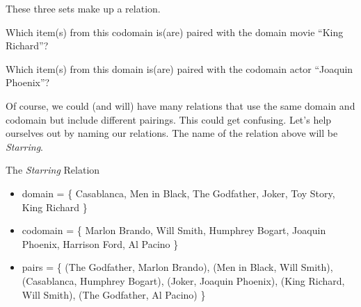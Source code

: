 \documentclass{ximera}
\begin{document}
These three sets make up a relation. 



\begin{question}

Which item(s) from this codomain is(are) paired with the domain movie ``King Richard''?
\begin{selectAll}
\end{selectAll}

\end{question}








\newpage

\begin{question}

Which item(s) from this domain is(are) paired with the codomain actor ``Joaquin Phoenix''?
\begin{selectAll}
\end{selectAll}

\end{question}






Of course, we could (and will) have many relations that use the same domain and codomain but include different pairings. This could get confusing.  Let's help ourselves out by naming our relations.  The name of the relation above will be \textit{Starring}.


\begin{example} The \textit{Starring} Relation

\begin{itemize}
\item domain = \{ Casablanca, Men in Black,  The Godfather, Joker, Toy Story, King Richard \}  
\item codomain = \{ Marlon Brando, Will Smith, Humphrey Bogart, Joaquin Phoenix, Harrison Ford, Al Pacino  \} 
\item pairs = \{ (The Godfather, Marlon Brando), (Men in Black, Will Smith), (Casablanca, Humphrey Bogart), (Joker, Joaquin Phoenix), (King Richard, Will Smith), (The Godfather, Al Pacino) \} 
\end{itemize}

\end{example}
\end{document}
